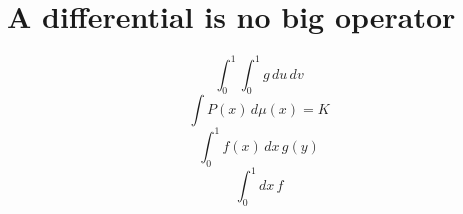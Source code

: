 \documentclass{article}
\begin{document}
\section{A differential is no big operator}
\[ \int_{0}^{1}\int_{0}^{1}g\,du\,dv \]
\[ \int P(x)\,d\mu(x)=K \]
\[ \int_{0}^{1}f(x)\,dx\,g(y) \]
\[ \int_0^1 dx\,f \]

\end{document}
